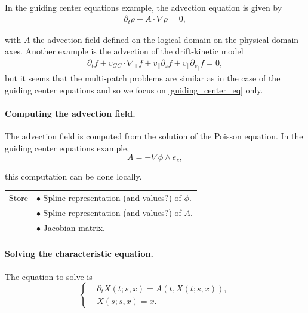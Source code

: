 \documentclass[presentation.tex]{subfiles}
\begin{document}
\paragraph{}
In the guiding center equations example, the advection equation is given by 
\begin{equation}
\begin{aligned}
	\partial_t \rho + A\cdot\nabla \rho = 0,
\end{aligned}
\label{guiding_center_eq}
\end{equation}

with $A$ the advection field defined on the logical domain on the physical domain axes. Another example is the advection of the drift-kinetic model 
\begin{equation}
\begin{aligned}
	\partial_t f 
		+ v_{GC}\cdot \nabla_{\perp}f 
		+ v_{\parallel} \partial_z f 
		+ \dot{v}_{\parallel} \partial_{v_{\parallel}} f
		= 0,
\end{aligned}
\end{equation}
but it seems that the multi-patch problems are similar as in the case of the guiding center equations and so we focus on \eqref{guiding_center_eq} only.


\paragraph{Computing the advection field.}
The advection field is computed from the solution of the Poisson equation. In the guiding center equations example,
\begin{equation}
	A = - \nabla \phi \wedge e_z,
\end{equation}

this computation can be done locally. 


\begin{center}
\begin{tabular}{ |l|l| } 
 \hline
 Store 	& $\bullet$ Spline representation (and values?) of $\phi$. \\
 		& $\bullet$ Spline representation (and values?) of $A$. \\
  		& $\bullet$ Jacobian matrix. \\
 \hline
\end{tabular}
\end{center}


\paragraph{Solving the characteristic equation. }
The equation to solve is 
\begin{equation}
\left\{
\begin{aligned}
	& \partial_t X(t; s, x)  = A(t,X(t; s, x)), \\
	& X(s; s, x) = x.
\end{aligned}
\right.
\end{equation}
\end{document}
